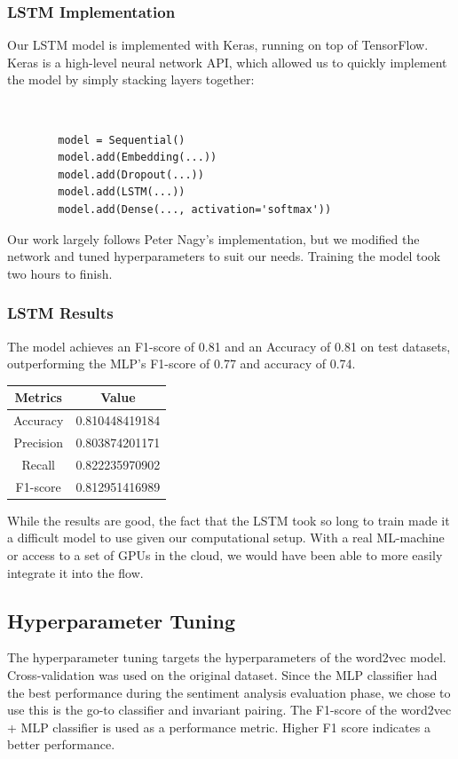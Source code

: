 \documentclass{sig-alternate-05-2015}
\begin{document}
	\subsubsection{LSTM Implementation}
	Our LSTM model is implemented with Keras, running on top of TensorFlow. Keras is a high-level neural network API, which allowed us to quickly implement the model by simply stacking layers together:
	{\tt \small
		\begin{verbatim}
		model = Sequential()
		model.add(Embedding(...))
		model.add(Dropout(...))
		model.add(LSTM(...))
		model.add(Dense(..., activation='softmax'))
		\end{verbatim}
	}
	
	Our work largely follows Peter Nagy's implementation\cite{5}, but we modified the network and tuned hyperparameters to suit our needs. Training the model took two hours to finish.
	
	\subsubsection{LSTM Results}
	The model achieves an F1-score of 0.81 and an Accuracy of 0.81 on test datasets, outperforming the MLP's F1-score of 0.77 and accuracy of 0.74.  \\
	
	\begin{center}
		\begin{tabular}{|c|c|}
			
			\hline
			Metrics & Value \\
			\hline
			Accuracy & 0.810448419184 \\
			Precision & 0.803874201171 \\
			Recall & 0.822235970902 \\
			F1-score & 0.812951416989 \\
			\hline
		\end{tabular}
	\end{center}
	
	While the results are good, the fact that the LSTM took so long to train made it a difficult model to use given our computational setup. With a real ML-machine or access to a set of GPUs in the cloud, we would have been able to more easily integrate it into the flow.
	\subsection{Hyperparameter Tuning}
	The hyperparameter tuning targets the hyperparameters of the word2vec model. Cross-validation was used on the original dataset. Since the MLP classifier had the best performance during the sentiment analysis evaluation phase, we chose to use this is the go-to classifier and invariant pairing. The F1-score of the word2vec + MLP classifier is used as a performance metric. Higher F1 score indicates a better performance. 
\end{document}
